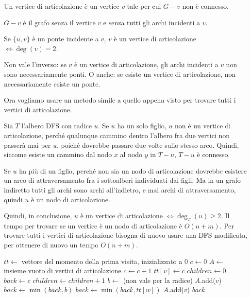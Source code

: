 \begin{defn}
Un vertice di articolazione \`e un vertice $v$ tale per cui $G - v$ non \`e connesso.
\end{defn}
$G - v$ \`e il grafo senza il vertice $v$ e senza tutti gli archi incidenti a $v$.

Se $\{ u, v \}$ \`e un ponte incidente a $v$, $v$ \`e un vertice di articolazione $\iff \deg(v) = 2$.

Non vale l'inverso: se $v$ \`e un vertice di articolazione, gli archi incidenti a $v$ non sono necessariamente ponti. O anche: se esiste un vertice di articolazione, non necessariamente esiste un ponte.

Ora vogliamo usare un metodo simile a quello appena visto per trovare tutti i vertici di articolazione.

Sia $T$ l'albero DFS con radice $u$. Se $u$ ha un solo figlio, $u$ non \`e un vertice di articolazione, perch\'e qualunque cammino dentro l'albero fra due vertici non passer\`a mai per $u$, poich\'e dovrebbe passare due volte sullo stesso arco. Quindi, siccome esiste un cammino dal nodo $x$ al nodo $y$ in $T - u$, $T - u$ \`e connesso.

Se $u$ ha pi\`u di un figlio, perch\'e non sia un nodo di articolazione dovrebbe esistere un arco di attraversamento fra i sottoalberi individuati dai figli. Ma in un grafo indiretto tutti gli archi sono archi all'indietro, e mai archi di attraversamento, quindi $u$ \`e un nodo di articolazione.

Quindi, in conclusione, $u$ \`e un vertice di articolazione $\iff \deg_T (u) \ge 2$. Il tempo per trovare se un vertice \`e un nodo di articolazione \`e $O(n + m)$. Per trovare tutti i vertici di articolazione bisogna di nuovo usare una DFS modificata, per ottenere di nuovo un tempo $O(n+m)$.

\begin{algorithm}
\caption{Algoritmo per trovare i vertici di articolazione}
\begin{algorithmic}[1]
\State $tt \gets$ vettore del momento della prima visita, inizializzato a 0
\State $c \gets 0$
\State $A \gets$ insieme vuoto di vertici di articolazione
    \State $c \gets c + 1$
    \State $tt[v] \gets c$
    \State $children \gets 0$
    \State $back \gets c$
            \State $children \gets children + 1$
            \State $b \gets$ 
             (non vale per la radice)
                \State $A$.add($v$)
            \EndIf
            \State $back \gets \min(back, b)$
        \Else
            \State $back \gets \min(back, tt[w])$
        \EndIf
    \EndFor
        \State $A$.add($v$)
    \EndIf
    \State \Return $back$
\EndFunction
\end{algorithmic}
\end{algorithm}

